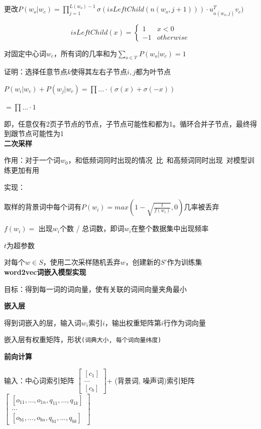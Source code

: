 \documentclass[UTF8]{ctexart}
\begin{document}
  \quad 更改$P(w_o | w_c) = \prod_{j=1}^{L(w_o) - 1} \sigma(isLeftChild(n(w_o, j+1))) \cdot u_{n(w_o, j)}^Tv_c)$

  \quad \quad \begin{equation*}
    isLeftChild(x) = \begin{cases}
    1 &x < 0\\
    -1 & otherwise
    \end{cases}
  \end{equation*}

  \quad \quad 对固定中心词$w_c$，所有词的几率和为$\sum_{o \in \mathcal{V}} P(w_o | w_c) = 1$

  \quad \quad \quad 证明：选择任意节点$k$使得其左右子节点$i, j$都为叶节点

  \quad \quad \quad \quad $P(w_i | w_c) + P(w_j | w_c) = \prod ... \cdot (\sigma(x) + \sigma(-x))$

  \quad \quad \quad \quad $ = \prod ... \cdot 1$

  \quad \quad \quad \quad 即，任意仅有2页子节点的节点，子节点可能性和都为1。循环合并子节点，最终得到跟节点可能性为1\\
\textbf{二次采样}

  作用：对于一个词$w_0$，和低频词同时出现的情况\ 比\ 和高频词同时出现\ 对模型训练更加有用

  实现：
  
  \quad 取样的背景词中每个词有$P(w_i) = max(1-\sqrt{\frac{t}{f(w_i)}}, 0)$几率被丢弃

  \quad \quad $f(w_i) = $ 出现$w_i$个数 / 总词数，即词$w_i$在整个数据集中出现频率

  \quad \quad $t$为超参数

  \quad 对每个$w \in S$，使用二次采样随机丢弃$w$，创建新的$S'$作为训练集\\
\textbf{word2vec词嵌入模型实现}

  目标：得到每一词的词向量，使有关联的词间向量夹角最小

  \textbf{嵌入层}

  \quad 得到词嵌入的层，输入词$w_i$索引$i$，输出权重矩阵第$i$行作为词向量

  \quad 嵌入层有权重矩阵，形状\texttt{(词典大小, 每个词向量纬度)}

  \textbf{前向计算}

  \quad 输入：中心词索引矩阵
    $\begin{bmatrix}
      [c_1] \\
      ... \\
      [c_b]
      \end{bmatrix}
    $+ (背景词, 噪声词)索引矩阵
    $\begin{bmatrix}
      [o_{11}, ..., o_{1n}, q_{11}, ..., q_{1k}] \\
      ... \\
      [o_{b1}, ..., o_{bn}, q_{b1}, ..., q_{bk}]
      \end{bmatrix}
    $
\end{document}
